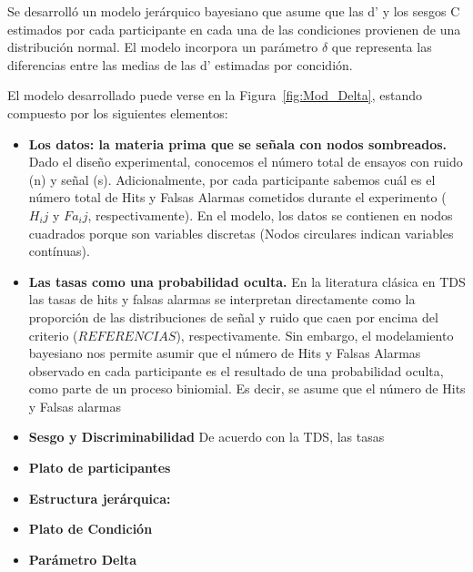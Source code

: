 Se desarrolló un modelo jerárquico bayesiano que asume que las d' y los sesgos C estimados por cada participante en cada una de las condiciones provienen de una distribución normal. El modelo incorpora un parámetro $\delta$ que representa las diferencias entre las medias de las d' estimadas por concidión.

El modelo desarrollado puede verse en la Figura~\ref{fig:Mod_Delta}, estando compuesto por los siguientes elementos:

\begin{itemize}
\item \textbf{Los datos: la materia prima que se señala con nodos sombreados.}
Dado el diseño experimental, conocemos el número total de ensayos con ruido (n) y señal (s). Adicionalmente, por cada participante sabemos cuál es el número total de Hits y Falsas Alarmas cometidos durante el experimento ($H_ij$ y $Fa_ij$, respectivamente). En el modelo, los datos se contienen en nodos cuadrados porque son variables discretas (Nodos circulares indican variables contínuas).\\

\item \textbf{Las tasas como una probabilidad oculta.} 
En la literatura clásica en TDS las tasas de hits y falsas alarmas se interpretan directamente como la proporción de las distribuciones de señal y ruido que caen por encima del criterio ($REFERENCIAS$), respectivamente. Sin embargo, el modelamiento bayesiano nos permite asumir que el número de Hits y Falsas Alarmas observado en cada participante es el resultado de una probabilidad oculta, como parte de un proceso biniomial. Es decir, se asume que el número de Hits y Falsas alarmas

\item \textbf{Sesgo y Discriminabilidad}
De acuerdo con la TDS, las tasas 

\item \textbf{Plato de participantes} 

\item \textbf{Estructura jerárquica:}

\item \textbf{Plato de Condición}

\item \textbf{Parámetro Delta}
\end{itemize} 

